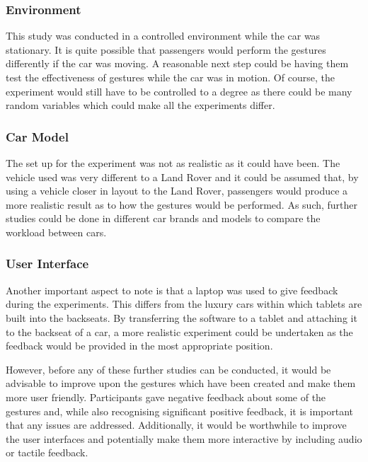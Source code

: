 \documentclass{l4proj}
\begin{document}
\subsubsection{Environment}
This study was conducted in a controlled environment while the car was stationary. It is quite possible that passengers would perform the gestures differently if the car was moving. A reasonable next step could be having them test the effectiveness of gestures while the car was in motion. Of course, the experiment would still have to be controlled to a degree as there could be many random variables which could make all the experiments differ.

\subsubsection{Car Model}
The set up for the experiment was not as realistic as it could have been. The vehicle used was very different to a Land Rover and it could be assumed that, by using a vehicle closer in layout to the Land Rover, passengers would produce a more realistic result as to how the gestures would be performed. As such, further studies could be done in different car brands and models to compare the workload between cars. 

\subsubsection{User Interface}
Another important aspect to note is that a laptop was used to give feedback during the experiments. This differs from the luxury cars within which tablets are built into the backseats. By transferring the software to a tablet and attaching it to the backseat of a car, a more realistic experiment could be undertaken as the feedback would be provided in the most appropriate position. 

However, before any of these further studies can be conducted, it would be advisable to improve upon the gestures which have been created and make them more user friendly. Participants gave negative feedback about some of the gestures and, while also recognising significant positive feedback, it is important that any issues are addressed. Additionally, it would be worthwhile to improve the user interfaces and potentially make them more interactive by including audio or tactile feedback.

%
% 
\end{document}
